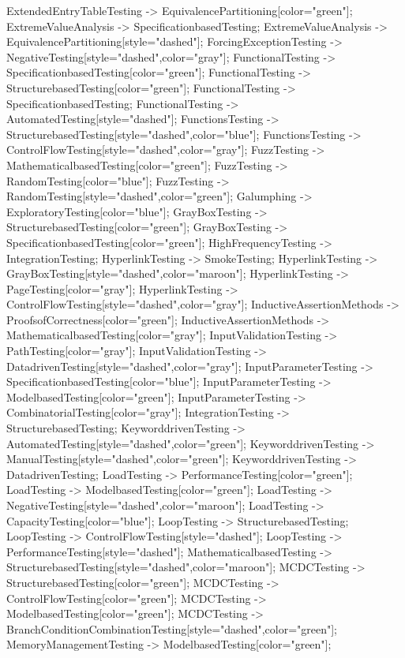 \documentclass{article}
\begin{document}
{ExtendedEntryTableTesting -> EquivalencePartitioning[color="green"];
ExtremeValueAnalysis -> SpecificationbasedTesting;
ExtremeValueAnalysis -> EquivalencePartitioning[style="dashed"];
ForcingExceptionTesting -> NegativeTesting[style="dashed",color="gray"];
FunctionalTesting -> SpecificationbasedTesting[color="green"];
FunctionalTesting -> StructurebasedTesting[color="green"];
FunctionalTesting -> SpecificationbasedTesting;
FunctionalTesting -> AutomatedTesting[style="dashed"];
FunctionsTesting -> StructurebasedTesting[style="dashed",color="blue"];
FunctionsTesting -> ControlFlowTesting[style="dashed",color="gray"];
FuzzTesting -> MathematicalbasedTesting[color="green"];
FuzzTesting -> RandomTesting[color="blue"];
FuzzTesting -> RandomTesting[style="dashed",color="green"];
Galumphing -> ExploratoryTesting[color="blue"];
GrayBoxTesting -> StructurebasedTesting[color="green"];
GrayBoxTesting -> SpecificationbasedTesting[color="green"];
HighFrequencyTesting -> IntegrationTesting;
HyperlinkTesting -> SmokeTesting;
HyperlinkTesting -> GrayBoxTesting[style="dashed",color="maroon"];
HyperlinkTesting -> PageTesting[color="gray"];
HyperlinkTesting -> ControlFlowTesting[style="dashed",color="gray"];
InductiveAssertionMethods -> ProofsofCorrectness[color="green"];
InductiveAssertionMethods -> MathematicalbasedTesting[color="gray"];
InputValidationTesting -> PathTesting[color="gray"];
InputValidationTesting -> DatadrivenTesting[style="dashed",color="gray"];
InputParameterTesting -> SpecificationbasedTesting[color="blue"];
InputParameterTesting -> ModelbasedTesting[color="green"];
InputParameterTesting -> CombinatorialTesting[color="gray"];
IntegrationTesting -> StructurebasedTesting;
KeyworddrivenTesting -> AutomatedTesting[style="dashed",color="green"];
KeyworddrivenTesting -> ManualTesting[style="dashed",color="green"];
KeyworddrivenTesting -> DatadrivenTesting;
LoadTesting -> PerformanceTesting[color="green"];
LoadTesting -> ModelbasedTesting[color="green"];
LoadTesting -> NegativeTesting[style="dashed",color="maroon"];
LoadTesting -> CapacityTesting[color="blue"];
LoopTesting -> StructurebasedTesting;
LoopTesting -> ControlFlowTesting[style="dashed"];
LoopTesting -> PerformanceTesting[style="dashed"];
MathematicalbasedTesting -> StructurebasedTesting[style="dashed",color="maroon"];
MCDCTesting -> StructurebasedTesting[color="green"];
MCDCTesting -> ControlFlowTesting[color="green"];
MCDCTesting -> ModelbasedTesting[color="green"];
MCDCTesting -> BranchConditionCombinationTesting[style="dashed",color="green"];
MemoryManagementTesting -> ModelbasedTesting[color="green"];
}
\end{document}
